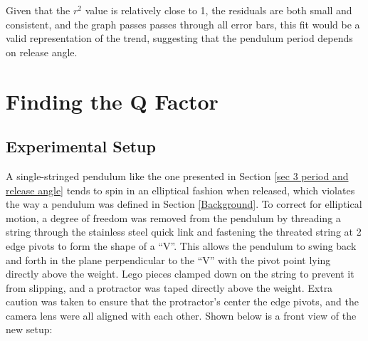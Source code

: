 \documentclass[11pt]{article}
\begin{document}
\begin{multicols}{2}
Given that the $r^2$ value is relatively close to 1, the residuals are both small and consistent, and the graph passes passes through all error bars, this fit would be a valid representation of the trend, suggesting that the pendulum period depends on release angle.

\section{Finding the Q Factor} \label{sec 4 Finding the Q Factor}

\subsection{Experimental Setup}
A single-stringed pendulum like the one presented in Section \ref{sec 3 period and release angle} tends to spin in an elliptical fashion when released, which violates the way a pendulum was defined in Section \ref{Background}. To correct for elliptical motion, a degree of freedom was removed from the pendulum by threading a string through the stainless steel quick link and fastening the threated string at 2 edge pivots to form the shape of a ``V''. This allows the pendulum to swing back and forth in the plane perpendicular to the ``V'' with the pivot point lying directly above the weight. Lego pieces clamped down on the string to prevent it from slipping, and a protractor was taped directly above the weight. Extra caution was taken to ensure that the protractor's center the edge pivots, and the camera lens were all aligned with each other. Shown below is a front view of the new setup:


\end{multicols}
\end{document}
